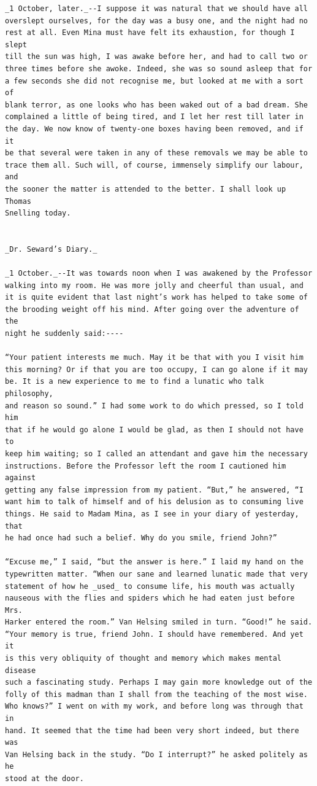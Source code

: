 \documentclass{article}
\begin{document}
\begin{verbatim}
_1 October, later._--I suppose it was natural that we should have all
overslept ourselves, for the day was a busy one, and the night had no
rest at all. Even Mina must have felt its exhaustion, for though I slept
till the sun was high, I was awake before her, and had to call two or
three times before she awoke. Indeed, she was so sound asleep that for
a few seconds she did not recognise me, but looked at me with a sort of
blank terror, as one looks who has been waked out of a bad dream. She
complained a little of being tired, and I let her rest till later in
the day. We now know of twenty-one boxes having been removed, and if it
be that several were taken in any of these removals we may be able to
trace them all. Such will, of course, immensely simplify our labour, and
the sooner the matter is attended to the better. I shall look up Thomas
Snelling today.


_Dr. Seward’s Diary._

_1 October._--It was towards noon when I was awakened by the Professor
walking into my room. He was more jolly and cheerful than usual, and
it is quite evident that last night’s work has helped to take some of
the brooding weight off his mind. After going over the adventure of the
night he suddenly said:----

“Your patient interests me much. May it be that with you I visit him
this morning? Or if that you are too occupy, I can go alone if it may
be. It is a new experience to me to find a lunatic who talk philosophy,
and reason so sound.” I had some work to do which pressed, so I told him
that if he would go alone I would be glad, as then I should not have to
keep him waiting; so I called an attendant and gave him the necessary
instructions. Before the Professor left the room I cautioned him against
getting any false impression from my patient. “But,” he answered, “I
want him to talk of himself and of his delusion as to consuming live
things. He said to Madam Mina, as I see in your diary of yesterday, that
he had once had such a belief. Why do you smile, friend John?”

“Excuse me,” I said, “but the answer is here.” I laid my hand on the
typewritten matter. “When our sane and learned lunatic made that very
statement of how he _used_ to consume life, his mouth was actually
nauseous with the flies and spiders which he had eaten just before Mrs.
Harker entered the room.” Van Helsing smiled in turn. “Good!” he said.
“Your memory is true, friend John. I should have remembered. And yet it
is this very obliquity of thought and memory which makes mental disease
such a fascinating study. Perhaps I may gain more knowledge out of the
folly of this madman than I shall from the teaching of the most wise.
Who knows?” I went on with my work, and before long was through that in
hand. It seemed that the time had been very short indeed, but there was
Van Helsing back in the study. “Do I interrupt?” he asked politely as he
stood at the door.


\end{verbatim}
\end{document}
